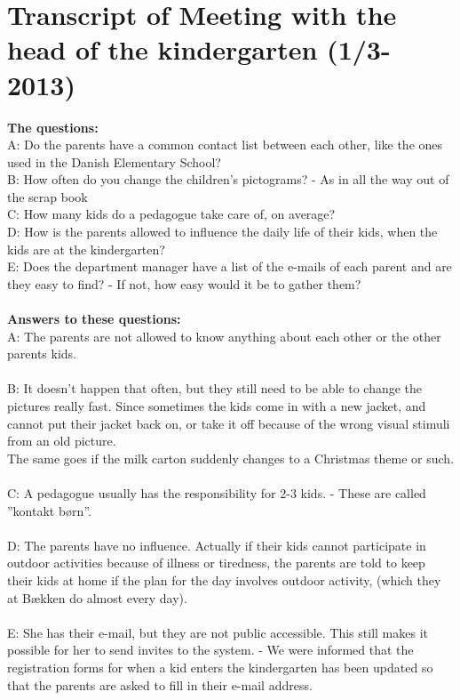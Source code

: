 \chapter{Transcript of Meeting with the head of the kindergarten (1/3-2013)}
\label{interviewMette}

\textbf{The questions:}\\
A: Do the parents have a common contact list between each other, like the ones used in the Danish Elementary School?\\
B: How often do you change the children's pictograms? - As in all the way out of the scrap book\\
C: How many kids do a pedagogue take care of, on average?\\
D: How is the parents allowed to influence the daily life of their kids, when the kids are at the kindergarten?\\
E: Does the department manager have a list of the e-mails of each parent and are they easy to find? - If not, how easy would it be to gather them?\\
\\
\textbf{Answers to these questions:}\\
A: The parents are not allowed to know anything about each other or the other parents kids.\\
\\
B: It doesn’t happen that often, but they still need to be able to change the pictures really fast. Since sometimes the kids come in with a new jacket, and cannot put their jacket back on, or take it off because of the wrong visual stimuli from an old picture.\\
The same goes if the milk carton suddenly changes to a Christmas theme or such.\\
\\
C: A pedagogue usually has the responsibility for 2-3 kids. - These are called ''kontakt børn''.\\
\\
D: The parents have no influence. Actually if their kids cannot participate in outdoor activities because of illness or tiredness, the parents are told to keep their kids at home if the plan for the day involves outdoor activity, (which they at Bækken do almost every day).\\
\\
E: She has their e-mail, but they are not public accessible. This still makes it possible for her to send invites to the system. - We were informed that the registration forms for when a kid enters the kindergarten has been updated so that the parents are asked to fill in their e-mail address.\\
